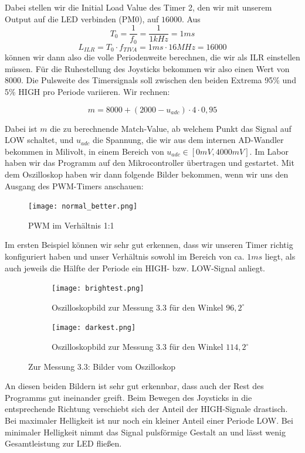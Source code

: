 \documentclass{article}
\begin{document}
Dabei stellen wir die Initial Load Value des Timer 2, den wir mit unserem Output auf die LED verbinden (PM0), auf $16000$. Aus
\[ T_{0} = \frac{1}{f_{0}} = \frac{1}{1kHz} = 1ms \]
\[ L_{ILR} = T_{0} \cdot f_{TIVA} = 1ms \cdot 16MHz = 16000\]
können wir dann also die volle Periodenweite berechnen, die wir als ILR einstellen müssen. Für die Ruhestellung des Joysticks bekommen wir also einen Wert von $8000$. Die Pulsweite des Timersignals soll zwischen den beiden Extrema 95\% und 5\% HIGH pro Periode variieren. Wir rechnen:

\[m = 8000 + (2000 - u_{adc}) \cdot 4 \cdot 0,95\]

Dabei ist $m$ die zu berechnende Match-Value, ab welchem Punkt das Signal auf LOW schaltet, und $u_{adc}$ die Spannung, die wir aus dem internen AD-Wandler bekommen in Milivolt, in einem Bereich von $u_{adc} \in [0mV, 4000mV]$. Im Labor haben wir das Programm auf den Mikrocontroller übertragen und gestartet. Mit dem Oszilloskop haben wir dann folgende Bilder bekommen, wenn wir uns den Ausgang des PWM-Timers anschauen:

\begin{figure}[h]
  \centering
  \texttt{[image: normal\_better.png]}
  \caption{PWM im Verhältnis 1:1}
  \label{fig:normal}
\end{figure}

Im ersten Beispiel können wir sehr gut erkennen, dass wir unseren Timer richtig konfiguriert haben und unser Verhältnis sowohl im Bereich von ca. $1ms$ liegt, als auch jeweils die Hälfte der Periode ein HIGH- bzw. LOW-Signal anliegt.


\begin{figure}[h]
  \centering
  \begin{subfigure}{.45\textwidth}
    \centering
    \texttt{[image: brightest.png]}
    \caption{Oszilloskopbild zur Messung 3.3 für den Winkel $96,2^{\circ}$}
  \end{subfigure}
  \begin{subfigure}{.45\textwidth}
    \centering
    \texttt{[image: darkest.png]}
    \caption{Oszilloskopbild zur Messung 3.3 für den Winkel $114,2^{\circ}$}
  \end{subfigure}
  \label{fig:bright_dark}
  \caption{Zur Messung 3.3: Bilder vom Oszilloskop}
\end{figure}

An diesen beiden Bildern ist sehr gut erkennbar, dass auch der Rest des Programms gut ineinander greift. Beim Bewegen des Joysticks in die entsprechende Richtung verschiebt sich der Anteil der HIGH-Signale drastisch. Bei maximaler Helligkeit ist nur noch ein kleiner Anteil einer Periode LOW. Bei minimaler Helligkeit nimmt das Signal pulsförmige Gestalt an und lässt wenig Gesamtleistung zur LED fließen.
\end{document}
